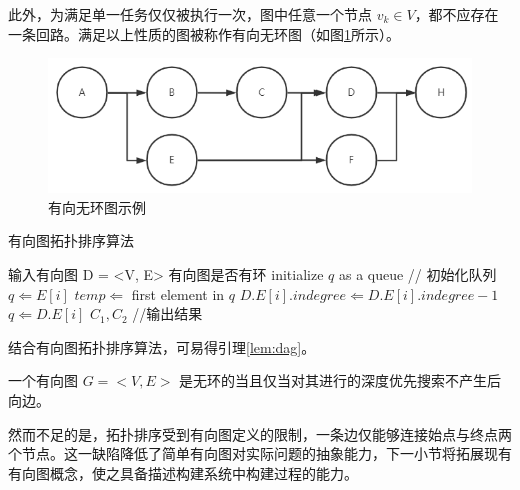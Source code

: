 此外，为满足单一任务仅仅被执行一次，图中任意一个节点 $v_k \in V$，都不应存在一条回路。满足以上性质的图被称作有向无环图（如图\ref{fig:dag}所示）。

\begin{figure}
    \centering
    \includegraphics[width=.7\textwidth]{figures/dag.png}
    \caption{有向无环图示例}
    \label{fig:dag}
\end{figure}

\renewcommand{\thealgorithm}{2}
    \begin{algorithm}
        \caption{有向图拓扑排序算法}
        \begin{algorithmic}[1]
            \Require 输入有向图 D = <V, E>
            \Ensure 有向图是否有环
            \State initialize $q$ as a queue // 初始化队列
                    \State $q \Leftarrow E[i]$
                \EndIf
            \EndFor
                \State $temp \Leftarrow$ first element in $q$
                        \State $D.E[i].indegree \Leftarrow D.E[i].indegree - 1$
                            $q \Leftarrow D.E[i]$
                        \EndIf
                    \EndIf
                \EndFor
            \EndWhile
            \State \Return $C_1, C_2$ //输出结果
        \end{algorithmic}
        \label{alg:topology-sort}
    \end{algorithm}

结合有向图拓扑排序算法，可易得引理\ref{lem:dag}。

\begin{lem}
    一个有向图 $G = <V, E>$ 是无环的当且仅当对其进行的深度优先搜索不产生后向边。\cite{DBLP:books/daglib/0023376}
    \label{lem:dag}
\end{lem}

然而不足的是，拓扑排序受到有向图定义的限制，一条边仅能够连接始点与终点两个节点。这一缺陷降低了简单有向图对实际问题的抽象能力，下一小节将拓展现有有向图概念，使之具备描述构建系统中构建过程的能力。

